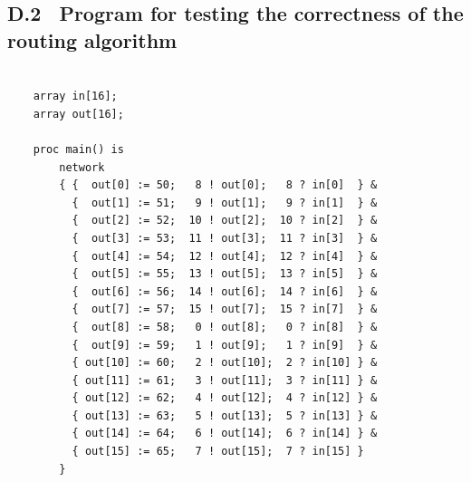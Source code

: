 \documentclass[a4paper, 12pt]{article}
\begin{document}
\subsection*{D.2 \ Program for testing the correctness of the routing algorithm}

\begin{lstlisting}

    array in[16];
    array out[16];

    proc main() is
        network
        { {  out[0] := 50;   8 ! out[0];   8 ? in[0]  } &
          {  out[1] := 51;   9 ! out[1];   9 ? in[1]  } &
          {  out[2] := 52;  10 ! out[2];  10 ? in[2]  } &
          {  out[3] := 53;  11 ! out[3];  11 ? in[3]  } &
          {  out[4] := 54;  12 ! out[4];  12 ? in[4]  } &
          {  out[5] := 55;  13 ! out[5];  13 ? in[5]  } &
          {  out[6] := 56;  14 ! out[6];  14 ? in[6]  } &
          {  out[7] := 57;  15 ! out[7];  15 ? in[7]  } &
          {  out[8] := 58;   0 ! out[8];   0 ? in[8]  } &
          {  out[9] := 59;   1 ! out[9];   1 ? in[9]  } &
          { out[10] := 60;   2 ! out[10];  2 ? in[10] } &
          { out[11] := 61;   3 ! out[11];  3 ? in[11] } &
          { out[12] := 62;   4 ! out[12];  4 ? in[12] } &
          { out[13] := 63;   5 ! out[13];  5 ? in[13] } &
          { out[14] := 64;   6 ! out[14];  6 ? in[14] } &
          { out[15] := 65;   7 ! out[15];  7 ? in[15] } 
        }

\end{lstlisting}

\newpage
\end{document}
